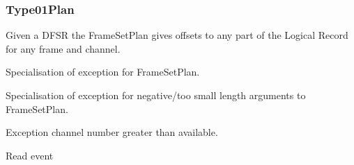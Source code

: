 \documentclass[letterpaper,10pt,english]{sphinxmanual}
\begin{document}
\subsubsection{Type01Plan}
\label{\detokenize{ref/LIS/core/Type01Plan::doc}}\label{\detokenize{ref/LIS/core/Type01Plan:totaldepth-lis-core-type01plan}}\label{\detokenize{ref/LIS/core/Type01Plan:type01plan}}\label{\detokenize{ref/LIS/core/Type01Plan:module-TotalDepth.LIS.core.Type01Plan}}
Given a DFSR the FrameSetPlan gives offsets to any part of the Logical Record
for any frame and channel.

\begin{fulllineitems}
\label{\detokenize{ref/LIS/core/Type01Plan:TotalDepth.LIS.core.Type01Plan.ExceptionFrameSetPlan}}
Specialisation of exception for FrameSetPlan.

\end{fulllineitems}


\begin{fulllineitems}
\label{\detokenize{ref/LIS/core/Type01Plan:TotalDepth.LIS.core.Type01Plan.ExceptionFrameSetPlanNegLen}}
Specialisation of exception for negative/too small length arguments to FrameSetPlan.

\end{fulllineitems}


\begin{fulllineitems}
\label{\detokenize{ref/LIS/core/Type01Plan:TotalDepth.LIS.core.Type01Plan.ExceptionFrameSetPlanOverrun}}
Exception channel number greater than available.

\end{fulllineitems}


\begin{fulllineitems}
\label{\detokenize{ref/LIS/core/Type01Plan:TotalDepth.LIS.core.Type01Plan.EVENT_READ}}
Read event

\end{fulllineitems}
\end{document}
